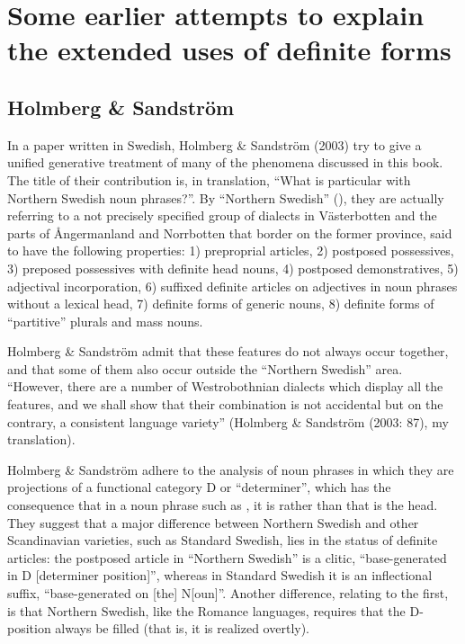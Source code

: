 
\section{\rmfamily Some earlier attempts to explain the extended uses of definite forms}
\subsection{\rmfamily Holmberg \& Sandström}

In a paper written in Swedish, Holmberg \& Sandström (2003) try to give a unified generative treatment of many of the phenomena discussed in this book. The title of their contribution is, in translation, “What is particular with Northern Swedish noun phrases?”. By “Northern Swedish” (), they are actually referring to a not precisely specified group of dialects in Västerbotten and the parts of Ångermanland and Norrbotten that border on the former province, said to have the following properties: 1) preproprial articles, 2) postposed possessives, 3) preposed possessives with definite head nouns, 4) postposed demonstratives, 5) adjectival incorporation, 6) suffixed definite articles on adjectives in noun phrases without a lexical head, 7) definite forms of generic nouns, 8) definite forms of “partitive” plurals and mass nouns.


Holmberg \& Sandström admit that these features do not always occur together, and that some of them also occur outside the “Northern Swedish” area. “However, there are a number of Westrobothnian dialects which display all the features, and we shall show that their combination is not accidental but on the contrary, a consistent language variety” (Holmberg \& Sandström (2003: 87), my translation).


Holmberg \& Sandström adhere to the analysis of noun phrases in which they are projections of a functional category D or “determiner”, which has the consequence that in a noun phrase such as , it is  rather than  that is the head. They suggest that a major difference between Northern Swedish and other Scandinavian varieties, such as Standard Swedish, lies in the status of definite articles: the postposed article in “Northern Swedish” is a clitic, “base-generated in D [determiner position]”, whereas in Standard Swedish it is an inflectional suffix, “base-generated on [the] N[oun]”. Another difference, relating to the first, is that Northern Swedish, like the Romance languages, requires that the D-position always be filled (that is, it is realized overtly).

